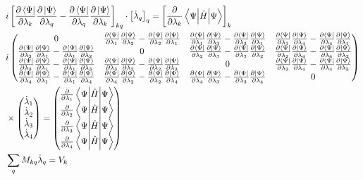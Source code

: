 \documentclass{aux/ttuthes2007}
\newcommand{\bra}[1]{\ensuremath{\left\langle#1\right\vert}}
\newcommand{\ket}[1]{\ensuremath{\left|#1\right\rangle}}
\newcommand{\sandwich}[3]{\left< #1 \middle\vert #2 \middle\vert #3 \right>}
\newcommand{\pd}[1]{\frac{\partial}{\partial #1}}
\newcommand{\kpp}[1]{\frac{\partial \ket\Psi}{\partial #1}}
\newcommand{\bpp}[1]{\frac{\partial \bra\Psi}{\partial #1}}
\begin{document}
\begin{equation}
	\begin{split}
		\label{eq:matrixderiv}
		&i \left [ \bpp{\lambda_k} \kpp{\lambda_q} 
			- \bpp{\lambda_q} \kpp{\lambda_k} \right ]_{kq}
		\cdot 	\left[ \dot \lambda_q \right]_q
		=	\left[\pd{\lambda_k}\sandwich{\Psi}{\hat H}{\Psi}\right]_k 
	\\%
		\span i
		\begin{pmatrix}
			0 
			&  \bpp{\lambda_1} \kpp{\lambda_2} -  \bpp{\lambda_2} \kpp{\lambda_1} 
			&  \bpp{\lambda_1} \kpp{\lambda_3} -  \bpp{\lambda_3} \kpp{\lambda_1} 
			&  \bpp{\lambda_1} \kpp{\lambda_4} -  \bpp{\lambda_4} \kpp{\lambda_1} 
		\\%
			 \bpp{\lambda_2} \kpp{\lambda_1} -  \bpp{\lambda_1} \kpp{\lambda_2} 
			& 0
			& \bpp{\lambda_2} \kpp{\lambda_3} -  \bpp{\lambda_3} \kpp{\lambda_2} 
			& \bpp{\lambda_2} \kpp{\lambda_4} -  \bpp{\lambda_4} \kpp{\lambda_2} 
		\\%
			 \bpp{\lambda_3} \kpp{\lambda_1} -  \bpp{\lambda_1} \kpp{\lambda_3} 
			& \bpp{\lambda_3} \kpp{\lambda_2} -  \bpp{\lambda_2} \kpp{\lambda_3} 
			& 0
			& \bpp{\lambda_3} \kpp{\lambda_4} -  \bpp{\lambda_4} \kpp{\lambda_3} 
		\\%
			 \bpp{\lambda_4} \kpp{\lambda_1} -  \bpp{\lambda_1} \kpp{\lambda_4} 
			& \bpp{\lambda_4} \kpp{\lambda_2} -  \bpp{\lambda_2} \kpp{\lambda_4} 
			& \bpp{\lambda_4} \kpp{\lambda_3} -  \bpp{\lambda_3} \kpp{\lambda_4} 
			& 0
		\end{pmatrix} 
	\\
		&\times
		\begin{pmatrix}
			\dot \lambda_1 \\
			\dot \lambda_2 \\
			\dot \lambda_3 \\
			\dot \lambda_4 
		\end{pmatrix} 
		=
		\begin{pmatrix}
			\pd {\lambda_1} \sandwich{\Psi}{\hat H}{\Psi}\\
			\pd {\lambda_2} \sandwich{\Psi}{\hat H}{\Psi}\\
			\pd {\lambda_3} \sandwich{\Psi}{\hat H}{\Psi}\\
			\pd {\lambda_4} \sandwich{\Psi}{\hat H}{\Psi}\\
		\end{pmatrix} 
	\\
		&\sum_q M_{kq} \dot \lambda_q = V_k
	\end{split}
\end{equation}
\end{document}
